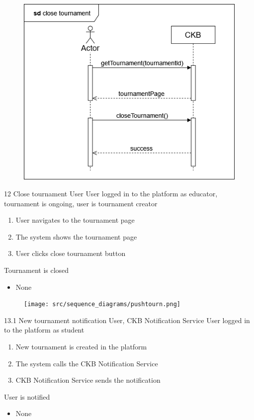 \usecase
{
    \begin{figure}[H]
        \centering
        \includegraphics[width=\textwidth]{src/sequence_diagrams/closetourn.png}
    \end{figure}
}
{12}
{Close tournament} %
{User} %
{User logged in to the platform as educator, tournament is ongoing, user is tournament creator} %
{ %
    \begin{enumerate}
        \item User navigates to the tournament page
        \item The system shows the tournament page
        \item User clicks close tournament button
    \end{enumerate}
}
{Tournament is closed} %
{ %
    \begin{itemize}
        \item None
    \end{itemize}
}
{ %

}

\usecase
{
    \begin{figure}[H]
        \centering
        \texttt{[image: src/sequence\_diagrams/pushtourn.png]}
    \end{figure}
}
{13.1}
{New tournament notification} %
{User, CKB Notification Service} %
{User logged in to the platform as student} %
{ %
    \begin{enumerate}
        \item New tournament is created in the platform
        \item The system calls the CKB Notification Service
        \item CKB Notification Service sends the notification
    \end{enumerate}
}
{User is notified} %
{ %
    \begin{itemize}
        \item None
    \end{itemize}
}
{ %

}

